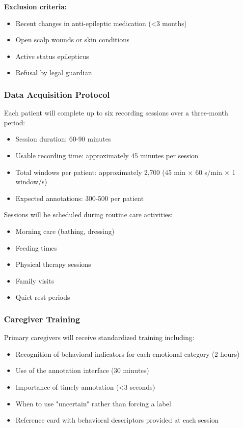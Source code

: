 \textbf{Exclusion criteria:}
\begin{itemize}
    \item Recent changes in anti-epileptic medication (<3 months)
    \item Open scalp wounds or skin conditions
    \item Active status epilepticus
    \item Refusal by legal guardian
\end{itemize}

\subsubsection{Data Acquisition Protocol}

Each patient will complete up to six recording sessions over a three-month period:
\begin{itemize}
    \item Session duration: 60-90 minutes
    \item Usable recording time: approximately 45 minutes per session
    \item Total windows per patient: approximately 2,700 (45 min $\times$ 60 s/min $\times$ 1 window/s)
    \item Expected annotations: 300-500 per patient
\end{itemize}

Sessions will be scheduled during routine care activities:
\begin{itemize}
    \item Morning care (bathing, dressing)
    \item Feeding times
    \item Physical therapy sessions
    \item Family visits
    \item Quiet rest periods
\end{itemize}

\subsubsection{Caregiver Training}

Primary caregivers will receive standardized training including:
\begin{itemize}
    \item Recognition of behavioral indicators for each emotional category (2 hours)
    \item Use of the annotation interface (30 minutes)
    \item Importance of timely annotation (<3 seconds)
    \item When to use "uncertain" rather than forcing a label
    \item Reference card with behavioral descriptors provided at each session
\end{itemize}

